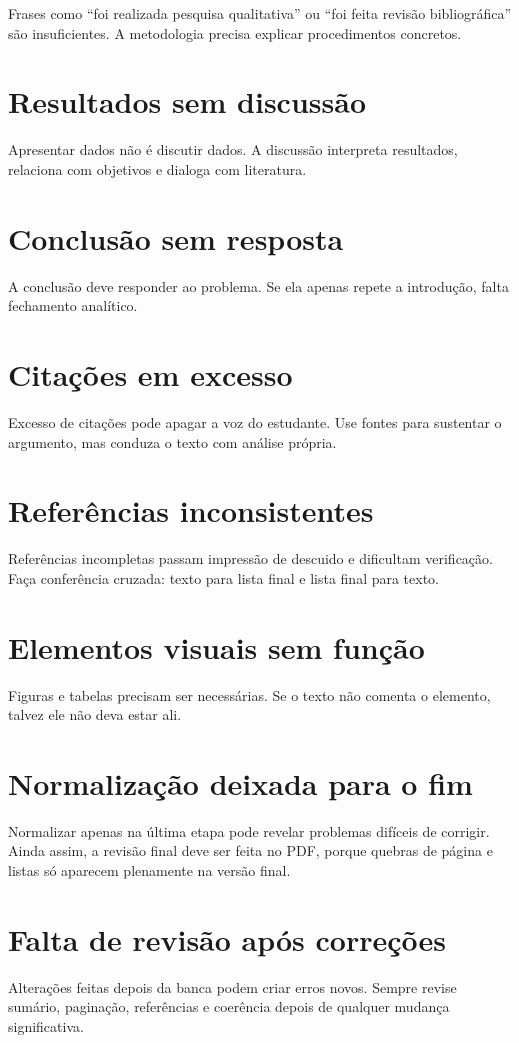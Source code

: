 Frases como ``foi realizada pesquisa qualitativa'' ou ``foi feita revisão bibliográfica'' são insuficientes. A metodologia precisa explicar procedimentos concretos.

\section{Resultados sem discussão}

Apresentar dados não é discutir dados. A discussão interpreta resultados, relaciona com objetivos e dialoga com literatura.

\section{Conclusão sem resposta}

A conclusão deve responder ao problema. Se ela apenas repete a introdução, falta fechamento analítico.

\section{Citações em excesso}

Excesso de citações pode apagar a voz do estudante. Use fontes para sustentar o argumento, mas conduza o texto com análise própria.

\section{Referências inconsistentes}

Referências incompletas passam impressão de descuido e dificultam verificação. Faça conferência cruzada: texto para lista final e lista final para texto.

\section{Elementos visuais sem função}

Figuras e tabelas precisam ser necessárias. Se o texto não comenta o elemento, talvez ele não deva estar ali.

\section{Normalização deixada para o fim}

Normalizar apenas na última etapa pode revelar problemas difíceis de corrigir. Ainda assim, a revisão final deve ser feita no PDF, porque quebras de página e listas só aparecem plenamente na versão final.

\section{Falta de revisão após correções}

Alterações feitas depois da banca podem criar erros novos. Sempre revise sumário, paginação, referências e coerência depois de qualquer mudança significativa.


